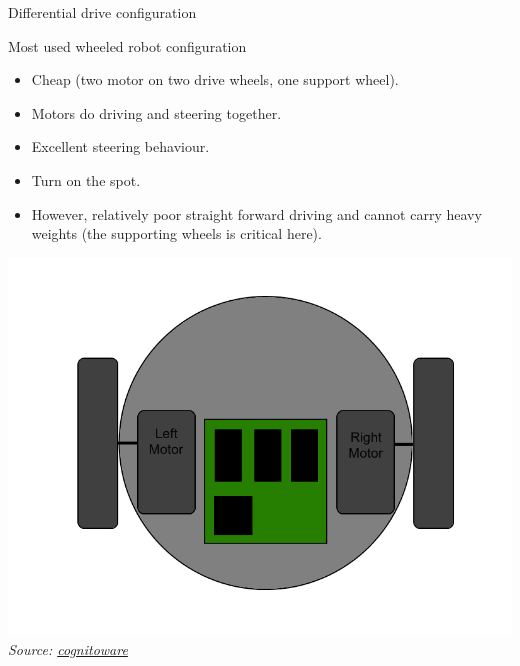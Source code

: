 \documentclass[compress]{beamer}
\newcommand{\source}[2]{{\tiny\it Source: \href{#1}{#2}}}
\begin{document}
\begin{frame}{Differential drive configuration}

Most used wheeled robot configuration

\begin{itemize}
    \item Cheap (two motor on two drive wheels, one support wheel).
    \item Motors do driving and steering together.
    \item Excellent steering behaviour.
    \item Turn on the spot.
    \item However, relatively poor straight forward driving and cannot carry
  heavy weights (the supporting wheels is critical here).
\end{itemize}

    \begin{center}
        \includegraphics[width=0.8\linewidth]{differentialdrive}
        \source{cognitoware.com}{cognitoware}
    \end{center}

\end{frame}
\end{document}
